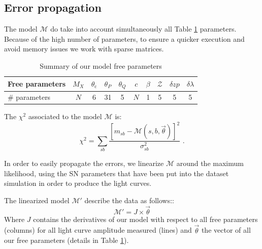 \documentclass[\docopts]{\docclass}
\begin{document}

\subsection{Error propagation}
\label{sec::linalg}

The model $\mathcal{M}$ do take into account simultaneously all Table \ref{tab:params} parameters. Because of the high number of parameters, to ensure a quicker execution and avoid memory issues we work with sparse matrices.

\begin{table}[t]
\begin{center}
\label{tab:params}
\caption{Summary of our model free parameters}
\begin{tabular}{l|ccccccccc}
\hline
\hline
Free parameters & $M_X$ & $\theta_\text{c}$ & $\theta_P$ & $\theta_Q$ & $c$ & $\beta$ & $\mathcal{Z}$ & $\delta zp$ & $\delta \lambda$ \\
\hline
\# parameters & $N$ & 6 & 31 & 5 & $N$ & 1 & 5 & 5 & 5 \\
\hline
\end{tabular}
\end{center}
\end{table}

The $\chi^2$ associated to the model $\mathcal{M}$ is:
\begin{equation}
\chi^2 = \sum_{sb}\frac{[m_{sb} - \mathcal{M}(s, b, \vec\theta)]^2}{\sigma_{sb}^2} \text{ .}
\end{equation}

In order to easily propagate the errors, we linearize $\mathcal{M}$ around the maximum likelihood, using the SN parameters that have been put into the dataset simulation in order to produce the light curves.

The linearized model $\mathcal{M'}$ describe the data as follows::
\begin{equation}
\mathcal{M'} = J \times \vec\theta
\end{equation}
Where $J$ contains the derivatives of our model with respect to all free parameters (columns) for all light curve amplitude measured (lines) and $\vec\theta$ the vector of all our free parameters (details in Table \ref{tab:params}).
\end{document}
